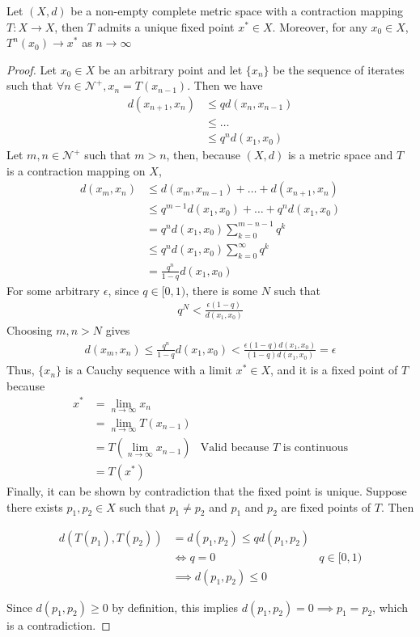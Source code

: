 \documentclass{article}
\begin{document}
\begin{thm} \label{thm:banach}
Let $(X, d)$ be a non-empty complete metric space with a contraction mapping $T : X \to X$, then $T$ admits a unique fixed point $x^* \in X$.
Moreover, for any $x_0 \in X$, $T^n(x_0) \to x^*$ as $n\to\infty$
\end{thm}

\begin{proof}
Let $x_0 \in X$ be an arbitrary point and let $\{x_n\}$ be the sequence of iterates such that $\forall n \in \mathcal{N}^+, x_n = T(x_{n-1})$. Then we have
\begin{align*}
    d(x_{n+1}, x_n) &\leq q d(x_n, x_{n-1})\\
    &\leq \ldots\\
    &\leq q^n d(x_1, x_0)
\end{align*}
Let $m, n \in \mathcal{N}^+$ such that $m > n$, then, because $(X, d)$ is a metric space and $T$ is a contraction mapping on $X$,
\begin{align*}
    d(x_m, x_n) &\leq d(x_m, x_{m-1}) + \ldots + d(x_{n+1}, x_n)\\
    &\leq q^{m-1}d(x_1, x_0) + \ldots + q^{n}d(x_1, x_0)\\
    &= q^n d(x_1, x_0) \sum_{k=0}^{m-n-1}q^k\\
    &\leq q^n d(x_1, x_0) \sum_{k=0}^{\infty}q^k\\
    &= \frac{q^n}{1 - q} d(x_1, x_0)
\end{align*}
For some arbitrary $\epsilon$, since $q \in [0, 1)$, there is some $N$ such that
\begin{align*}
    q^N < \frac{\epsilon (1-q)}{d(x_1, x_0)}
\end{align*}
Choosing $m, n > N$ gives
\begin{align*}
    d(x_m, x_n) \leq \frac{q^n}{1 - q} d(x_1, x_0) < \frac{\epsilon (1 - q) d(x_1, x_0)}{(1 - q) d(x_1, x_0)} = \epsilon
\end{align*}
Thus, $\{x_n\}$ is a Cauchy sequence with a limit $x^* \in X$, and it is a fixed point of $T$ because
\begin{align*}
    x^* &= \lim_{n\to\infty} x_n\\
    &= \lim_{n\to\infty} T(x_{n-1})\\
    &= T(\lim_{n\to\infty} x_{n-1}) &\text{Valid because $T$ is continuous}\\
    &= T(x^*)
\end{align*}
Finally, it can be shown by contradiction that the fixed point is unique. Suppose there exists $p_1, p_2 \in X$ such that $p_1 \ne p_2$ and $p_1$ and $p_2$ are fixed points of $T$. Then

\begin{align*}
d(T(p_1), T(p_2)) &= d(p_1, p_2) \leq qd(p_1, p_2)\\
&\iff q = 0 &\text{$q \in [0, 1)$}\\
&\implies d(p_1, p_2) \leq 0 
\end{align*}

Since $d(p_1, p_2) \geq 0$ by definition, this implies $d(p_1, p_2) = 0 \implies p_1 = p_2$, which is a contradiction. \qedhere
\end{proof}
\end{document}
